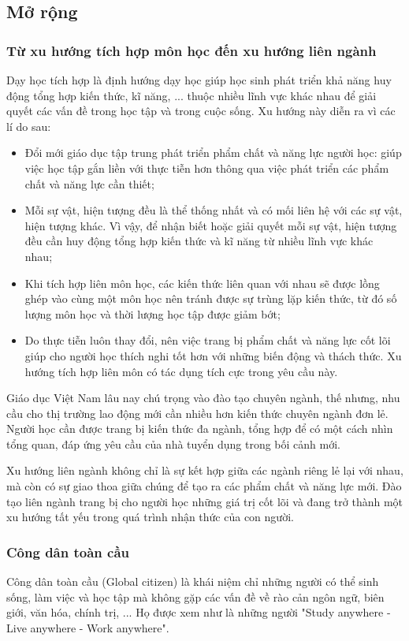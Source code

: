 \subsection{Mở rộng}
\subsubsection{Từ xu hướng tích hợp môn học đến xu hướng liên ngành}
Dạy học tích hợp là định hướng dạy học giúp học sinh phát triển khả năng huy động tổng hợp kiến thức, kĩ năng, ... thuộc nhiều lĩnh vực khác nhau để giải quyết các vấn đề trong học tập và trong cuộc sống. Xu hướng này diễn ra vì các lí do sau:
\begin{itemize}
	\item Đổi mới giáo dục tập trung phát triển phẩm chất và năng lực người học: giúp việc học tập gắn liền với thực tiễn hơn thông qua việc phát triển các phẩm chất và năng lực cần thiết;
	\item Mỗi sự vật, hiện tượng đều là thể thống nhất và có mối liên hệ với các sự vật, hiện tượng khác. Vì vậy, để nhận biết hoặc giải quyết mỗi sự vật, hiện tượng đều cần huy động tổng hợp kiến thức và kĩ năng từ nhiều lĩnh vực khác nhau;
	\item Khi tích hợp liên môn học, các kiến thức liên quan với nhau sẽ được lồng ghép vào cùng một môn học nên tránh được sự trùng lặp kiến thức, từ đó số lượng môn học và thời lượng học tập được giảm bớt;
	\item Do thực tiễn luôn thay đổi, nên việc trang bị phẩm chất và năng lực cốt lõi giúp cho người học thích nghi tốt hơn với những biến động và thách thức. Xu hướng tích hợp liên môn có tác dụng tích cực trong yêu cầu này.
\end{itemize}

	Giáo dục Việt Nam lâu nay chú trọng vào đào tạo chuyên ngành, thế nhưng, nhu cầu cho thị trường lao động mới cần nhiều hơn kiến thức chuyên ngành đơn lẻ. Người học cần được trang bị kiến thức đa ngành, tổng hợp để có một cách nhìn tổng quan, đáp ứng yêu cầu của nhà tuyển dụng trong bối cảnh mới.
	
	Xu hướng liên ngành không chỉ là sự kết hợp giữa các ngành riêng lẻ lại với nhau, mà còn có sự giao thoa giữa chúng để tạo ra các phẩm chất và năng lực mới. Đào tạo liên ngành trang bị cho người học những giá trị cốt lõi và đang trở thành một xu hướng tất yếu trong quá trình nhận thức của con người.
\subsubsection{Công dân toàn cầu}
Công dân toàn cầu (Global citizen) là khái niệm chỉ những người có thể sinh sống, làm việc và học tập mà không gặp các vấn đề về rào cản ngôn ngữ, biên giới, văn hóa, chính trị, ...  Họ được xem như là những người "Study anywhere - Live anywhere - Work anywhere".

